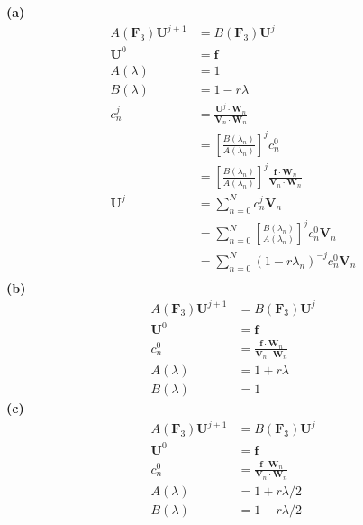 \documentclass{amsbook}%
\theoremstyle{plain}
\numberwithin{equation}{section}
\begin{document}
		\noindent\textbf{(a)}
		\begin{align}
			A(\mathbf{F}_3)\mathbf{U}^{j+1} & = B(\mathbf{F}_3)\mathbf{U}^j\\
			\mathbf{U}^0 & = \mathbf{f}\\
			A(\lambda) & = 1\\
			B(\lambda) & = 1-r\lambda\\			
			c^j_n & = \frac{\mathbf{U}^j\cdot\mathbf{W}_n}{\mathbf{V}_n\cdot\mathbf{W}_n}\\
			& = \left[\frac{B(\lambda_n)}{A(\lambda_n)}\right]^jc^0_n\\
			& = \left[\frac{B(\lambda_n)}{A(\lambda_n)}\right]^j\frac{\mathbf{f}\cdot\mathbf{W}_n}{\mathbf{V}_n\cdot\mathbf{W}_n}\\
			\mathbf{U}^j & = \sum_{n=0}^N{c^j_n\mathbf{V}_n}\\
			& = \sum_{n=0}^N{\left[\frac{B(\lambda_n)}{A(\lambda_n)}\right]^jc^0_n\mathbf{V}_n}\\
			& = \sum_{n=0}^N{(1-r\lambda_n)^{-j}c^0_n\mathbf{V}_n}\\
		\end{align}
		\textbf{(b)}
		\begin{align}
			A(\mathbf{F}_3)\mathbf{U}^{j+1} & = B(\mathbf{F}_3)\mathbf{U}^j\\
			\mathbf{U}^0 & = \mathbf{f}\\
			c^0_n & = \frac{\mathbf{f}\cdot\mathbf{W}_n}{\mathbf{V}_n\cdot\mathbf{W}_n}\\
			A(\lambda) & = 1+r\lambda\\
			B(\lambda) & = 1
		\end{align}
		\textbf{(c)}
		\begin{align}
			A(\mathbf{F}_3)\mathbf{U}^{j+1} & = B(\mathbf{F}_3)\mathbf{U}^j\\
			\mathbf{U}^0 & = \mathbf{f}\\
			c^0_n & = \frac{\mathbf{f}\cdot\mathbf{W}_n}{\mathbf{V}_n\cdot\mathbf{W}_n}\\
			A(\lambda) & = 1+r\lambda/2\\
			B(\lambda) & = 1-r\lambda/2
		\end{align}		
		
\end{document}
